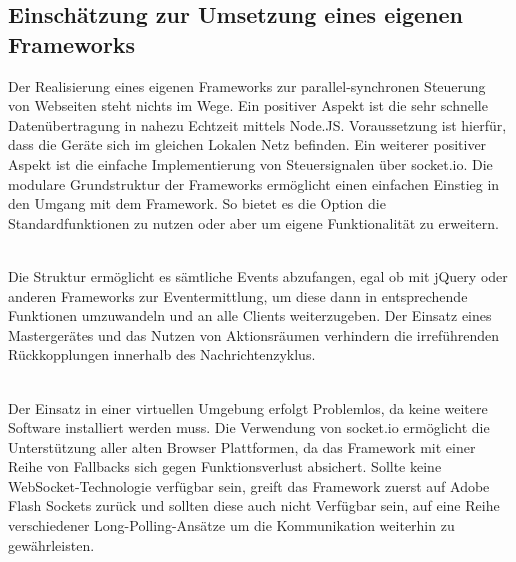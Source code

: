 
	\subsection{Einschätzung zur Umsetzung eines eigenen Frameworks}
	Der Realisierung eines eigenen Frameworks zur parallel-synchronen Steuerung von Webseiten steht nichts im Wege. Ein positiver Aspekt ist die sehr schnelle Datenübertragung in nahezu Echtzeit mittels Node.JS. Voraussetzung ist hierfür, dass die Geräte sich im gleichen Lokalen Netz befinden. Ein weiterer positiver Aspekt ist die einfache Implementierung von Steuersignalen über socket.io. Die modulare Grundstruktur der Frameworks ermöglicht einen einfachen Einstieg in den Umgang mit dem Framework. So bietet es die Option die Standardfunktionen zu nutzen oder aber um eigene Funktionalität zu erweitern.

\\Die Struktur ermöglicht es sämtliche Events abzufangen, egal ob mit jQuery oder anderen Frameworks zur Eventermittlung, um diese dann in entsprechende Funktionen umzuwandeln und an alle Clients weiterzugeben. Der Einsatz eines Mastergerätes und das Nutzen von Aktionsräumen verhindern die irreführenden Rückkopplungen innerhalb des Nachrichtenzyklus. 

\\Der Einsatz in einer virtuellen Umgebung erfolgt Problemlos, da keine weitere Software installiert werden muss. Die Verwendung von socket.io ermöglicht die Unterstützung aller alten Browser Plattformen, da das Framework mit einer Reihe von Fallbacks sich gegen Funktionsverlust absichert. Sollte keine WebSocket-Technologie verfügbar sein, greift das Framework zuerst auf Adobe Flash Sockets zurück und sollten diese auch nicht Verfügbar sein, auf eine Reihe verschiedener Long-Polling-Ansätze um die Kommunikation weiterhin zu gewährleisten.











